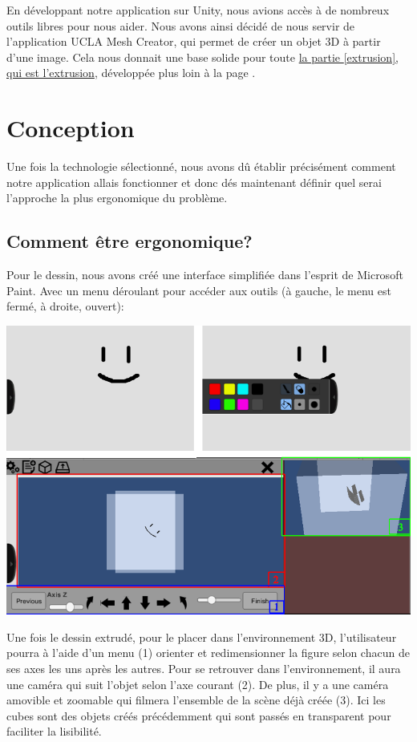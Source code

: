 \documentclass[a4paper,11pt]{article}
\begin{document}
		En développant notre application sur Unity\cite{Unity}, nous avions accès à de nombreux outils libres pour nous aider. Nous avons ainsi décidé de nous servir de l'application UCLA Mesh Creator\cite{UCLA}, qui permet de créer un objet 3D à partir d'une image. Cela nous donnait une base solide pour toute \hyperlink{ancre}{la partie \ref{extrusion}, qui est l'extrusion}, développée plus loin à la page \pageref{extrusion}. 
		
	
		
	\section{Conception}
	
		Une fois la technologie sélectionné, nous avons dû établir précisément comment notre application allais fonctionner et donc dés maintenant définir quel serai l'approche la plus ergonomique du problème.
		
		\subsection{Comment être ergonomique?} %
		Pour le dessin, nous avons créé une interface simplifiée dans l'esprit de Microsoft Paint. Avec un menu déroulant pour accéder aux outils (à gauche, le menu est fermé, à droite, ouvert):
		\centerline{\includegraphics[scale=0.5]{images/Cmt_placer2.png}}
		
		Une fois le dessin extrudé, pour le placer dans l'environnement 3D, l'utilisateur pourra à l'aide d'un menu (1) orienter et redimensionner la figure selon chacun de ses axes les uns après les autres. Pour se retrouver dans l'environnement, il aura une caméra qui suit l'objet selon l'axe courant (2). De plus, il y a une caméra amovible et zoomable qui filmera l'ensemble de la scène déjà créée (3). Ici les cubes sont des objets créés précédemment qui sont passés en transparent pour faciliter la lisibilité.
		\newline
		
\end{document}
